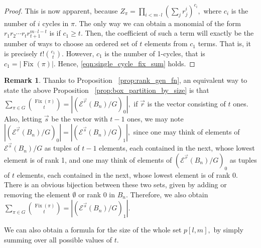 \documentclass[10 pt]{amsart}
\theoremstyle{plain}
\theoremstyle{definition}
\newtheorem{rem}[thm]{Remark}
\theoremstyle{remark}
\numberwithin{equation}{section}
\renewcommand{\vec}[1]{\overrightarrow{#1}}
\def\Fix{\operatorname{Fix}}
\begin{document}
\begin{proof}
This is now apparent, because $Z_\pi = \prod_{i < m \cdot l} (\sum_j r_j^i)^{c_i},$ where $c_i$ is the number of $i$ cycles in $\pi.$ The only way we can obtain a monomial of the form $r_1 r_2 \cdots r_t r_{t+1}^{m\cdot l - t}$ is if $c_1 \geq t.$ Then, the coefficient of such a term will exactly be the number of ways to choose an ordered set of $t$ elements from $c_1$ terms. That is, it is precisely $t!\binom {c_1} t.$ However, $c_1$ is the number of 1-cycles, that is $c_1 = |\Fix(\pi)|.$ Hence, \eqref{eqn:single_cycle_fix_sum} holds.
\end{proof}

\begin{rem}
\label{rem:box_partitions_relation_to_f}
Thanks to Proposition ~\ref{prop:rank_gen_fn}, an equivalent way to state the above Proposition ~\ref{prop:box_partition_by_size} is that $\sum_{\pi \in G} \binom {\Fix(\pi)} t = |(\mathcal E^{\vec r}(B_n)/G)_0|,$ if $\vec r$ is the vector consisting of $t$ ones. Also, letting $\vec s$ be the vector with $t-1$ ones, we may note $ |(\mathcal E^{\vec r}(B_n)/G)_0| =  |(\mathcal E^{\vec s}(B_n)/G)_1|,$ since one may think of elements of 
$\mathcal E^{\vec s}(B_n)/G$ as tuples of $t-1$ elements, each contained in the next, whose lowest element is of rank 1, and one may think of elements of $(\mathcal E^{\vec r}(B_n)/G)_0$ as tuples of $t$ elements, each contained in the next, whose lowest element is of rank 0. There is an obvious bijection between these two sets, given by adding or removing the element $\emptyset$ or rank 0 in $B_n.$ Therefore, we also obtain $\sum_{\pi \in G} \binom {\Fix(\pi)} t = |(\mathcal E^{\vec s}(B_n)/G)_1|.$
\end{rem}

We can also obtain a formula for the size of the whole set $p[l,m],$ by simply summing over all possible values of $t.$
\end{document}
